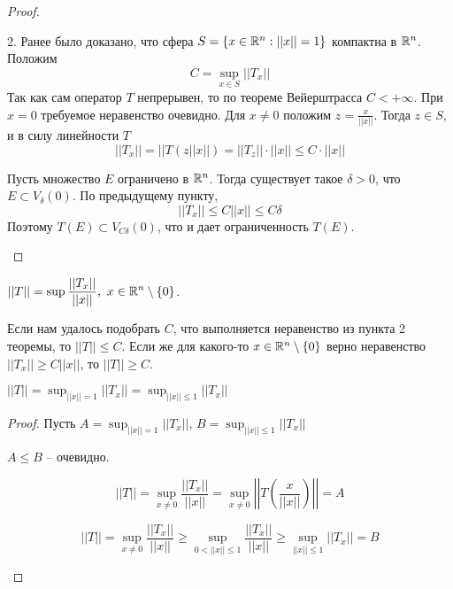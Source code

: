     \begin{proof}
        \begin{MyList} 
            \item[2.] Ранее было доказано, что сфера $S = \{x \in \mathbb{R}^n : ||x|| = 1\}$ компактна в $\mathbb{R}^n$. Положим
            \[C = \sup_{x \in S} ||T_x||\]
            Так как сам оператор $T$ непрерывен, то по теореме Вейерштрасса $C < +\infty$. При $x = 0$ требуемое неравенство очевидно. 
            Для $x \neq 0$ положим $z = \frac{x}{||x||}$. Тогда $z \in S$, и в силу линейности $T$ 
            \[||T_x|| = ||T(z||x||) = ||T_z|| \cdot ||x|| \leqslant C \cdot ||x||\]
            \item Пусть множество $E$ ограничено в $\mathbb{R}^n$. Тогда существует такое $\delta > 0$, что $E \subset V_\delta(0)$. По предыдущему пункту,
            \[||T_x|| \leqslant C ||x|| \leqslant C \delta\]    
            Поэтому $T(E) \subset V_{C \delta}(0)$, что и дает ограниченность $T(E)$.
        \end{MyList}
    \end{proof}

    \begin{Def}
        $||T|| = \displaystyle{\sup \frac{||T_x||}{||x||}, \ x \in \mathbb{R}^n \setminus \{0\}}$.
    \end{Def}

    \begin{Rem}
        Если нам удалось подобрать $C$, что выполняется неравенство из пункта 2 теоремы, то $||T|| \leqslant C$. 
        Если же для какого-то $x \in \mathbb{R}^n \setminus \{0\}$ верно неравенство $||T_x|| \geqslant C||x||$, то $||T|| \geqslant C$.
    \end{Rem}

    \begin{Rem}
        $||T|| = \displaystyle{\sup_{||x|| = 1} ||T_x|| = \sup_{||x|| \leqslant 1} ||T_x||}$
    \end{Rem}

    \begin{proof}
        Пусть $A = \displaystyle{\sup_{||x|| = 1} ||T_x||}$, $B = \displaystyle{\sup_{||x|| \leqslant 1} ||T_x||}$ 
        \begin{MyList} 
            \item $A \leqslant B $ -- очевидно.
            \item \[
                ||T|| = \sup_{x \neq 0} \frac{||T_x||}{||x||} = \sup_{x \neq 0} \left|\left|T\left(\frac{x}{||x||}\right)\right|\right| = A
            \]
            \item \[||T|| = \sup_{x \neq 0} \frac{||T_x||}{||x||} \geqslant \sup_{0 < ||x|| \leqslant 1} \frac{||T_x||}{||x||} \geqslant \sup_{||x|| \leqslant 1} ||T_x|| = B\]
        \end{MyList}
    \end{proof}

